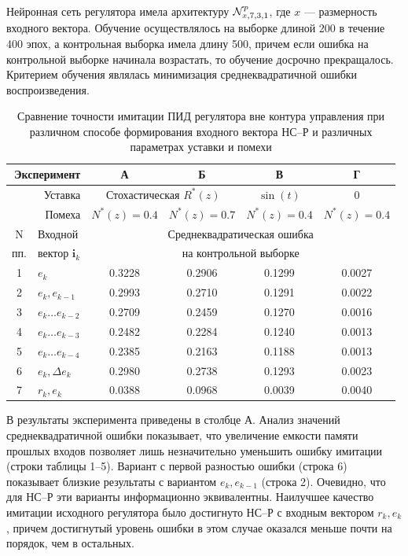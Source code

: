 Нейронная сеть регулятора имела архитектуру $\mathcal{N}^p_{x,7,3,1}$,
где $x$ --- размерность входного вектора.  Обучение осуществлялось на
выборке длиной 200 в течение 400 эпох, а контрольная выборка имела
длину 500, причем если ошибка на контрольной выборке начинала
возрастать, то обучение досрочно прекращалось.  Критерием обучения
являлась минимизация среднеквадратичной ошибки воспроизведения.

\begin{table}[ht]
\centering
\caption{Сравнение точности имитации ПИД регулятора вне контура управления
         при различном способе формирования входного вектора НС--Р и
         различных параметрах уставки и помехи}
\label{tabl:nnc_pretr_input_vec}
\begin{tabular}{|c|l|c|c|c|c|}
\hline
\multicolumn{2}{|r|}{Эксперимент} & {\sf А} & {\sf Б} & {\sf В} & {\sf Г}\\
\hline
\multicolumn{2}{|r|}{Уставка} &
  \multicolumn{2}{|c|}{Стохастическая $R^*(z)$} & $\sin(t)$ & $0$ \\
\hline
\multicolumn{2}{|r|}{Помеха} & $N^*(z)=0.4$ & $N^*(z)=0.7$ & $N^*(z)=0.4$ & $N^*(z)=0.4$\\
\hline\hline
N   & Входной               & \multicolumn{4}{|c|}{Среднеквадратическая ошибка} \\
пп. & вектор $\mathbf{i}_k$ & \multicolumn{4}{|c|}{на контрольной выборке}\\
\hline
1 & $e_k$                 & 0.3228 & 0.2906 & 0.1299 & 0.0027\\
2 & $e_k,e_{k-1}$         & 0.2993 & 0.2710 & 0.1291 & 0.0022\\
3 & $e_k\ldots e_{k-2}$   & 0.2709 & 0.2459 & 0.1270 & 0.0016\\
4 & $e_k\ldots e_{k-3}$   & 0.2482 & 0.2284 & 0.1240 & 0.0013\\
5 & $e_k\ldots e_{k-4}$   & 0.2385 & 0.2163 & 0.1188 & 0.0013\\
6 & $e_k,\Delta e_k$      & 0.2980 & 0.2738 & 0.1293 & 0.0023\\
7 & $r_k,e_k$             & 0.0388 & 0.0968 & 0.0039 & 0.0040\\
\hline
\end{tabular}
\end{table}


В  результаты эксперимента приведены
в столбце {\sf А}.  Анализ значений среднеквадратичной ошибки
показывает, что увеличение емкости памяти прошлых входов позволяет
лишь незначительно уменьшить ошибку имитации (строки таблицы 1--5).
Вариант с первой разностью ошибки (строка 6) показывает близкие
результаты с вариантом $e_k,e_{k-1}$ (строка 2).  Очевидно, что для
НС--Р эти варианты информационно эквивалентны.  Наилучшее качество
имитации исходного регулятора было достигнуто НС--Р с входным вектором
$r_k,e_k$, причем достигнутый уровень ошибки в этом случае оказался
меньше почти на порядок, чем в остальных.

